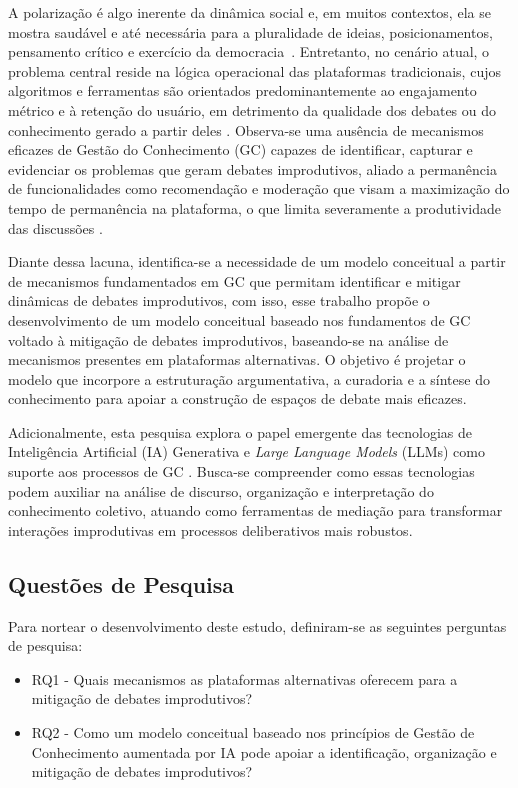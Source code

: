 \documentclass[conference]{IEEEtran} \IEEEoverridecommandlockouts %
\begin{document}
A polarização é algo inerente da dinâmica social e, em muitos contextos, ela se mostra saudável e até necessária para a pluralidade de ideias, posicionamentos, pensamento crítico e exercício da democracia~\cite{schneider2026mitigating,mccoy2018polarization}. Entretanto, no cenário atual, o problema central reside na lógica operacional das plataformas tradicionais, cujos algoritmos e ferramentas são orientados predominantemente ao engajamento métrico e à retenção do usuário, em detrimento da qualidade dos debates ou do conhecimento gerado a partir deles \cite{alatawiSurveyEchoChambers2021}. Observa-se uma ausência de mecanismos eficazes de Gestão do Conhecimento (GC) capazes de identificar, capturar e evidenciar os problemas que geram debates improdutivos, aliado a permanência de funcionalidades como recomendação e moderação que visam a maximização do tempo de permanência na plataforma, o que limita severamente a produtividade das discussões \cite{schneider2026mitigating}.

Diante dessa lacuna, identifica-se a necessidade de um modelo conceitual a partir de mecanismos fundamentados em GC que permitam identificar e mitigar dinâmicas de debates improdutivos, com isso, esse trabalho propõe o desenvolvimento de um modelo conceitual baseado nos fundamentos de GC voltado à mitigação de debates improdutivos, baseando-se na análise de mecanismos presentes em plataformas alternativas. O objetivo é projetar o modelo que incorpore a estruturação argumentativa, a curadoria e a síntese do conhecimento para apoiar a construção de espaços de debate mais eficazes.

Adicionalmente, esta pesquisa explora o papel emergente das tecnologias de Inteligência Artificial (IA) Generativa e \textit{Large Language Models} (LLMs) como suporte aos processos de GC \cite{jarrahiArtificialIntelligenceKnowledge2023}. Busca-se compreender como essas tecnologias podem auxiliar na análise de discurso, organização e interpretação do conhecimento coletivo, atuando como ferramentas de mediação para transformar interações improdutivas em processos deliberativos mais robustos.

\subsection{Questões de Pesquisa}

Para nortear o desenvolvimento deste estudo, definiram-se as seguintes perguntas de pesquisa:
\begin{itemize}
    \item RQ1 - Quais mecanismos as plataformas alternativas oferecem para a mitigação de debates improdutivos?
    \item RQ2 - Como um modelo conceitual baseado nos princípios de Gestão de Conhecimento aumentada por IA pode apoiar a identificação, organização e mitigação de debates improdutivos?
\end{itemize}
\end{document}
